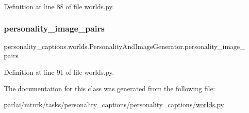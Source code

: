 Definition at line 88 of file worlds.\+py.

\mbox{\label{classpersonality__captions_1_1worlds_1_1PersonalityAndImageGenerator_a28343ba1f0f6ee18157127f40bcac251}} 
\subsubsection{\texorpdfstring{personality\+\_\+image\+\_\+pairs}{personality\_image\_pairs}}
{\footnotesize\ttfamily personality\+\_\+captions.\+worlds.\+Personality\+And\+Image\+Generator.\+personality\+\_\+image\+\_\+pairs}



Definition at line 91 of file worlds.\+py.



The documentation for this class was generated from the following file\+:\begin{DoxyCompactItemize}
\item 
parlai/mturk/tasks/personality\+\_\+captions/personality\+\_\+captions/\hyperlink{parlai_2mturk_2tasks_2personality__captions_2personality__captions_2worlds_8py}{worlds.\+py}\end{DoxyCompactItemize}
